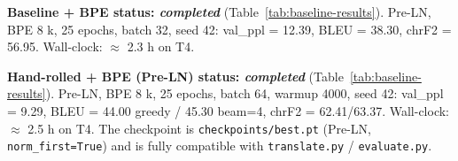 \textbf{Baseline + BPE status: \textit{completed}} (Table~\ref{tab:baseline-results}). Pre-LN, BPE 8 k, 25 epochs, batch 32, seed 42: val\_ppl = 12.39, BLEU = 38.30, chrF2 = 56.95. Wall-clock: $\approx$ 2.3 h on T4.

\textbf{Hand-rolled + BPE (Pre-LN) status: \textit{completed}} (Table~\ref{tab:baseline-results}). Pre-LN, BPE 8 k, 25 epochs, batch 64, warmup 4000, seed 42: val\_ppl = 9.29, BLEU = 44.00 greedy / 45.30 beam=4, chrF2 = 62.41/63.37. Wall-clock: $\approx$ 2.5 h on T4. The checkpoint is \texttt{checkpoints/best.pt} (Pre-LN, \texttt{norm\_first=True}) and is fully compatible with \texttt{translate.py} / \texttt{evaluate.py}.
